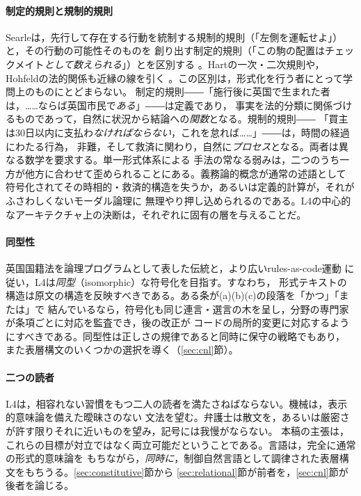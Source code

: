 \documentclass[11pt,a4paper]{ltjsarticle}
\begin{document}
\paragraph{制定的規則と規制的規則}
Searleは，先行して存在する行動を統制する規制的規則（「左側を運転せよ」）と，その行動の可能性そのものを
創り出す制定的規則（「この駒の配置はチェックメイト\emph{として数えられる}」）とを区別する
\cite{searle1969speech}。Hartの一次・二次規則や，Hohfeldの法的関係も近縁の線を引く
\cite{hart1961concept,hohfeld1913}。この区別は，形式化を行う者にとって学問上のものにとどまらない。
制定的規則――「施行後に英国で生まれた者は，……ならば英国市民で\emph{ある}」――は定義であり，
事実を法的分類に関係づけるものであって，自然に状況から結論への\emph{関数}となる。規制的規則――
「買主は30日以内に支払わ\emph{なければならない}，これを怠れば……」――は，時間の経過にわたる行為，
非難，そして救済に関わり，自然に\emph{プロセス}となる。両者は異なる数学を要求する。単一形式体系による
手法の常なる弱みは，二つのうち一方が他方に合わせて歪められることにある。義務論的概念が通常の述語として
符号化されてその時相的・救済的構造を失うか，あるいは定義的計算が，それがふさわしくないモーダル論理に
無理やり押し込められるのである。L4の中心的なアーキテクチャ上の決断は，それぞれに固有の層を与えることだ。

\paragraph{同型性}
英国国籍法を論理プログラムとして表した伝統\cite{sergot1986bna}と，より広いrules-as-code運動
\cite{mohun2020rulesascode}に従い，L4は\emph{同型}（isomorphic）な符号化を目指す。すなわち，
形式テキストの構造は原文の構造を反映すべきである。ある条が(a)(b)(c)の段落を「かつ」「または」で
結んでいるなら，符号化も同じ連言・選言の木を呈し，分野の専門家が条項ごとに対応を監査でき，後の改正が
コードの局所的変更に対応するようにすべきである。同型性は正しさの規律であると同時に保守の戦略でもあり，
また表層構文のいくつかの選択を導く（\ref{sec:cnl}節）。

\paragraph{二つの読者}
L4は，相容れない習慣をもつ二人の読者を満たさねばならない。機械は，表示的意味論を備えた曖昧さのない
文法を望む。弁護士は散文を，あるいは厳密さが許す限りそれに近いものを望み，記号には我慢がならない。
本稿の主張は，これらの目標が対立ではなく両立可能だということである。言語は，完全に通常の形式的意味論を
もちながら，\emph{同時に}，制御自然言語として調律された表層構文をもちうる。\ref{sec:constitutive}節から
\ref{sec:relational}節が前者を，\ref{sec:cnl}節が後者を論じる。
\end{document}
